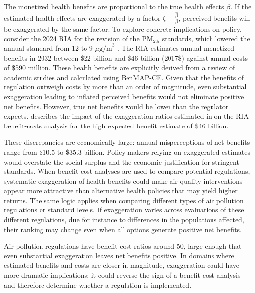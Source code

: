\documentclass[12pt]{article}
\begin{document}
		
		The monetized health benefits are proportional to the true health effects $\beta$. If the estimated health effects are exaggerated by a factor $\zeta = \frac{\hat{\beta}}{\beta}$, perceived benefits will be exaggerated by the same factor. To explore concrete implications on policy, consider the 2024 RIA for the revision of the PM$_{2.5}$ standards, which lowered the annual standard from 12 to 9 $\mu\text{g/m}^3$ \citep{u.s.epa_final_2024}. The RIA estimates annual monetized benefits in 2032 between \$22 billion and \$46 billion (2017\$) against annual costs of \$590 million.  %
		These health benefits are explicitly derived from a review of academic studies and calculated using BenMAP-CE.  %
		Given that the benefits of regulation outweigh costs by more than an order of magnitude, even substantial exaggeration leading to inflated perceived benefits would not eliminate positive net benefits. However, true net benefits would be lower than the regulator expects.  describes the impact of the exaggeration ratios estimated in  on the RIA benefit-costs analysis for the high expected benefit estimate of \$46 billion.
		
		
		
		These discrepancies are economically large: annual misperceptions of net benefits range from \$10.5 to \$35.3 billion. Policy makers relying on exaggerated estimates would overstate the social surplus and the economic justification for stringent standards. When benefit-cost analyses are used to compare potential regulations, systematic exaggeration of health benefits could make air quality interventions appear more attractive than alternative health policies that may yield higher returns. The same logic applies when comparing different types of air pollution regulations or standard levels. If exaggeration varies across evaluations of these different regulations, due for instance to differences in the populations affected, their ranking may change even when all options generate positive net benefits.
		
		Air pollution regulations have benefit-cost ratios around 50, large enough that even substantial exaggeration leaves net benefits positive. In domains where estimated benefits and costs are closer in magnitude, exaggeration could have more dramatic implications: it could reverse the sign of a benefit-cost analysis and therefore determine whether a regulation is implemented.
		
\end{document}
